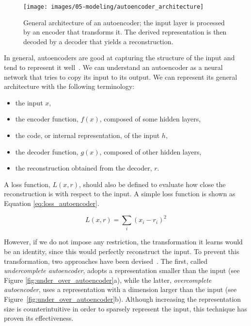 \begin{figure}[h]
\centering
\texttt{[image: images/05-modeling/autoencoder\_architecture]}
\caption{General architecture of an autoencoder; the input layer is processed by an encoder that transforms it. The derived representation is then decoded by a decoder that yields a reconstruction.}
\label{fig:autoencoder_architecture}
\end{figure}

In general, autoencoders are good at capturing the structure of the input and tend to represent it well~\cite{goodfellow_deep_2016}. We can understand an autoencoder as a neural network that tries to copy its input to its output. We can represent its general architecture with the following terminology:

\begin{itemize}[leftmargin=*,labelsep=5.8mm]
	\item the input $x$,
  \item the {encoder function}, $f(x)$, composed of some hidden layers,
  \item the {code}, or internal representation, of the input $h$,
  \item the {decoder function}, $g(x)$, composed of other hidden layers,
  \item the reconstruction obtained from the decoder, $r$.
\end{itemize}

A {loss function}, $L(x, r)$, should also be defined to evaluate how close the reconstruction is with respect to the input.
A simple loss function is shown as Equation \eqref{eq:loss_autoencoder}.

\begin{equation} \label{eq:loss_autoencoder}
L(x,r) = \sum_{i} (x_i - r_i)^2
\end{equation}

However, if we do not impose any restriction, the transformation it learns would be an identity, since this would perfectly reconstruct the input. To prevent this transformation, two approaches have been devised~\citep{goodfellow_deep_2016}. The first, called \textit{undercomplete autoencoder}, adopts a representation smaller than the input (see Figure \ref{fig:under_over_autoencoder}a), while the latter, \textit{overcomplete autoencoder}, uses a representation with a dimension larger than the input (see Figure~\ref{fig:under_over_autoencoder}b). Although increasing the representation size is counterintuitive in order to sparsely represent the input, this technique has proven its effectiveness.

